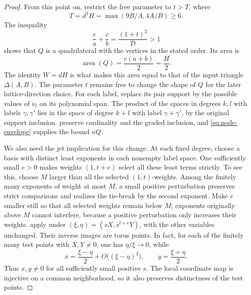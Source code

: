 \begin{proof}
From this point on, restrict the free parameter to $t>T$, where
\begin{equation}\label{eq:node-parameters}
 T=d^2H=\max(9B/A,4A/B)\ge6.
\end{equation}
The inequality
\[
 \frac ca+\frac cb=\frac{(1+t)^2}{Tt}>1
\]
shows that $Q$ is a quadrilateral with the vertices in the stated order. Its area is
\begin{equation}\label{eq:node-area}
 \operatorname{area}(Q)=\frac{c(a+b)}2=\frac H2.
\end{equation}
The identity $W=dH$ is what makes this area equal to that of the input triangle $\Delta(A,B)$.  The parameter $t$ remains free to change the shape of $Q$ for the later lattice-direction choice. For each label, replace its pair support by the possible values of $\nu_t$ on its polynomial span.  The product of the spaces in degrees $k,l$ with labels $\gamma,\gamma'$ lies in the space of degree $k+l$ with label $\gamma+\gamma'$, by the original support inclusion.  preserve cardinality and the graded inclusion, and \eqref{eq:node-envelope} supplies the bound $\kappa Q$.

We also need the jet implication for this change.  At each fixed degree, choose a basis with distinct least exponents in each nonempty label space. One sufficiently small $e>0$ makes weights $(1,t+e)$ select all these least terms strictly.  To see this, choose $M$ larger than all the selected $(1,t)$-weights.  Among the finitely many exponents of weight at most $M$, a small positive perturbation preserves strict comparisons and realizes the tie-break by the second exponent.  Make $e$ smaller still so that all selected weights remain below $M$; exponents originally above $M$ cannot interfere, because a positive perturbation only increases their weights.  apply under $(\xi,\eta)=(sX,s^{t+e}Y)$, with the other variables unchanged. Their inverse images are torus points.  In fact, for each of the finitely many test points with $X,Y\ne0$, one has $\eta/\xi\to0$, while
\[
 x=\frac{\xi-\eta}{2}+O\bigl((\xi-\eta)^2\bigr),
 \qquad y=\frac{\xi+\eta}{2}.
\]
Thus $x,y\ne0$ for all sufficiently small positive $s$.  The local coordinate map is injective on a common neighborhood, so it also preserves distinctness of the test points.


\end{proof}
